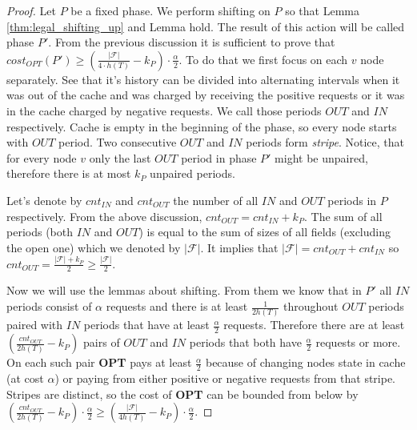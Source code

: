 \begin{proof}
Let $P$ be a fixed phase. We perform shifting on $P$ so that Lemma 
\ref{thm:legal_shifting_up} and Lemma \label{thm:legal_shifting_down} hold. The 
result of this action will be called phase $P'$. From the previous discussion 
it is sufficient to prove that $cost_{OPT}(P') \geq (\frac{|\mathcal{F}|}{4 
\cdot h(T)}-k_P) \cdot \frac{\alpha}{2}$. To do that we first focus on each $v$ 
node separately. See that it's history can be divided into alternating 
intervals when it was out of the cache and was charged by receiving the positive 
requests or it was in the cache charged by negative requests. We call those 
periods $OUT$ and $IN$ respectively. Cache is empty in the beginning of the 
phase, so every node starts with $OUT$ period. Two consecutive $OUT$ and $IN$ 
periods form \textit{stripe}. Notice, that for every node $v$ only the last 
$OUT$ period in phase $P'$ might be unpaired, therefore there is at most $k_P$ 
unpaired periods.

Let's denote by $cnt_{IN}$ and $cnt_{OUT}$ the number of all $IN$ and $OUT$ 
periods in $P$ respectively. From the above discussion, $cnt_{OUT} = cnt_{IN} + 
k_P$. The sum of all periods (both $IN$ and $OUT$) is equal to the sum of sizes 
of all fields (excluding the open one) which we denoted by $|\mathcal{F}|$. It 
implies that $|\mathcal{F}| = cnt_{OUT} + cnt_{IN}$ so $cnt_{OUT} = 
\frac{|\mathcal{F}| + k_P}{2} \geq \frac{|\mathcal{F}|}{2}.$

Now we will use the lemmas about shifting. From them we know that in $P'$ all 
$IN$ periods consist of $\alpha$ requests and there is at least 
$\frac{1}{2h(T)}$ throughout $OUT$ periods paired with $IN$ periods that have 
at least $\frac{\alpha}{2}$ requests. Therefore there are at least 
$(\frac{cnt_{OUT}}{2h(T)} - k_P)$ pairs of $OUT$ and $IN$ periods that both 
have $\frac{\alpha}{2}$ requests or more. On each such pair \textbf{OPT} pays 
at least $\frac{\alpha}{2}$ because of changing nodes state in cache (at cost 
$\alpha$) or paying from either positive or negative requests from that stripe. 
Stripes are distinct, so the cost of \textbf{OPT} can be bounded from below by 
$(\frac{cnt_{OUT}}{2h(T)} - k_P) \cdot \frac{\alpha}{2} \geq 
(\frac{|\mathcal{F}|}{4h(T)} - k_P) \cdot  \frac{\alpha}{2}$.
\end{proof}

